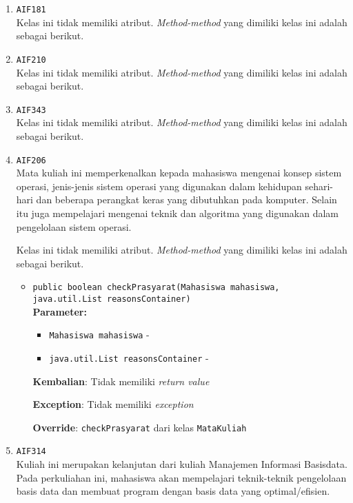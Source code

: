 \documentclass{article}
\begin{document}
\begin{enumerate}
\begin{itemize}
\end{itemize}
\item \texttt{AIF181}\\ 
Kelas ini tidak memiliki atribut. \textit{Method-method} yang dimiliki kelas ini adalah sebagai berikut.
\begin{itemize}
\end{itemize}
\item \texttt{AIF210}\\ 
Kelas ini tidak memiliki atribut. \textit{Method-method} yang dimiliki kelas ini adalah sebagai berikut.
\begin{itemize}
\end{itemize}
\item \texttt{AIF343}\\ 
Kelas ini tidak memiliki atribut. \textit{Method-method} yang dimiliki kelas ini adalah sebagai berikut.
\begin{itemize}
\end{itemize}
\item \texttt{AIF206}\\ 
Mata kuliah ini memperkenalkan kepada mahasiswa mengenai konsep sistem 
 operasi, jenis-jenis sistem operasi yang digunakan dalam kehidupan 
 sehari-hari dan beberapa perangkat keras yang dibutuhkan pada komputer. 
 Selain itu juga mempelajari mengenai teknik dan algoritma yang digunakan 
 dalam pengelolaan sistem operasi.

Kelas ini tidak memiliki atribut. \textit{Method-method} yang dimiliki kelas ini adalah sebagai berikut.
\begin{itemize}
\item \texttt{public boolean checkPrasyarat(Mahasiswa mahasiswa, java.util.List reasonsContainer)}\\ 


\textbf{Parameter:}\begin{itemize}
\item \texttt{Mahasiswa mahasiswa} - 
\item \texttt{java.util.List reasonsContainer} - 
\end{itemize}
\textbf{Kembalian}: Tidak memiliki \textit{return value}

\textbf{Exception}: Tidak memiliki \textit{exception}

\textbf{Override}: \texttt{checkPrasyarat} dari kelas \texttt{MataKuliah}

\end{itemize}
\item \texttt{AIF314}\\ 
Kuliah ini merupakan kelanjutan dari kuliah Manajemen Informasi Basisdata.
 Pada perkuliahan ini, mahasiswa akan mempelajari teknik-teknik pengelolaan
 basis data dan membuat program dengan basis data yang optimal/efisien.


\end{enumerate}
\end{document}
